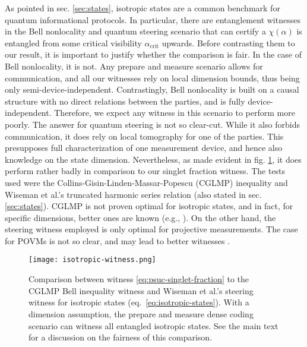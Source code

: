         As pointed in sec. \ref{sec:states}, isotropic states are a common benchmark for quantum informational protocols. In particular, there are entanglement witnesses in the Bell nonlocality and quantum steering scenario that can certify a $\chi(\alpha)$ is entangled from some critical visibility $\alpha_{\text{crit}}$ upwards. Before contrasting them to our result, it is important to justify whether the comparison is fair. In the case of Bell nonlocality, it is not. Any prepare and measure scenario allows for communication, and all our witnesses rely on local dimension bounds, thus being only semi-device-independent. Contrastingly, Bell nonlocality is built on a causal structure with no direct relations between the parties, and is fully device-independent. Therefore, we expect any witness in this scenario to perform more poorly. The answer for quantum steering is not so clear-cut. While it also forbids communication, it does rely on local tomography for one of the parties. This presupposes full characterization of one measurement device, and hence also knowledge on the state dimension. Nevertheless, as made evident in fig. \ref{fig:isotropic-witness}, it does perform rather badly in comparison to our singlet fraction witness. The tests used were the Collins-Gisin-Linden-Massar-Popescu (CGLMP) inequality \cite{collins_cglmp_2002} and Wiseman et al.'s truncated harmonic series relation \cite{wiseman_2007_steering} (also stated in sec. \ref{sec:states}). CGLMP is not proven optimal for isotropic states, and in fact, for specific dimensions, better ones are known (e.g., \cite{divianszky_qutritwitness_2017}). On the other hand, the steering witness employed is only optimal for projective measurements. The case for POVMs is not so clear, and may lead to better witnesses \cite{nguyen_somemeasurements_2020}.
        
        \begin{figure}
            \centering
            \texttt{[image: isotropic-witness.png]}
            \caption{Comparison between witness \ref{eq:psuc-singlet-fraction} to the CGLMP Bell inequality witness \cite{collins_cglmp_2002} and Wiseman et al.'s steering witness \cite{wiseman_2007_steering} for isotropic states (eq.~\eqref{eq:isotropic-states}). With a dimension assumption, the prepare and measure dense coding scenario can witness all entangled isotropic states. See the main text for a discussion on the fairness of this comparison.}
        \label{fig:isotropic-witness}
        \end{figure}
        
